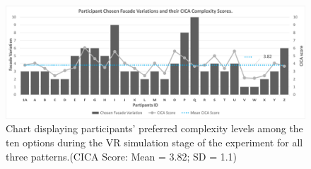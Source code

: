 \begin{figure}[htb]
    \centering
    \includegraphics[width=\linewidth]{Images/ComplexityLevelChosenChart}
    \caption{Chart displaying participants' preferred complexity levels among the ten options during the VR simulation stage of the experiment for all three patterns.(CICA Score: Mean = 3.82; SD = 1.1)}
    \label{fig:ComplexityLevelChosenChart}
\end{figure}

